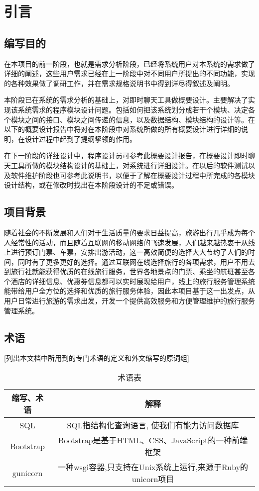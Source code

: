 \chapter{引言}
\section{编写目的}
在本项目的前一阶段，也就是需求分析阶段，已经将系统用户对本系统的需求做了详细的阐述，这些用户需求已经在上一阶段中对不同用户所提出的不同功能，实现的各种效果做了调研工作，并在需求规格说明书中得到详尽得叙述及阐明。

本阶段已在系统的需求分析的基础上，对即时聊天工具做概要设计。主要解决了实现该系统需求的程序模块设计问题。包括如何把该系统划分成若干个模块、决定各个模块之间的接口、模块之间传递的信息，以及数据结构、模块结构的设计等。在以下的概要设计报告中将对在本阶段中对系统所做的所有概要设计进行详细的说明，在设计过程中起到了提纲挈领的作用。

在下一阶段的详细设计中，程序设计员可参考此概要设计报告，在概要设计即时聊天工具所做的模块结构设计的基础上，对系统进行详细设计。在以后的软件测试以及软件维护阶段也可参考此说明书，以便于了解在概要设计过程中所完成的各模块设计结构，或在修改时找出在本阶段设计的不足或错误。


\section{项目背景}
随着社会的不断发展和人们对于生活质量的要求日益提高，旅游出行几乎成为每个人经常性的活动，而且随着互联网的移动网络的飞速发展，人们越来越热衷于从线上进行预订门票、车票，安排出游活动，这一高效简便的选择大大节约了人们的时间，同时有了更多更好的选择。通过互联网在线选择旅行的各项需求，用户不用去到旅行社就能获得优质的在线旅行服务，世界各地景点的门票、乘坐的航班甚至各个酒店的详细信息、优惠券信息都可以实时展现给用户，线上的旅行服务管理系统能带给用户全方位的选择和优质的旅行服务体验，因此本项目基于这一出发点，从用户日常进行旅游的需求出发，开发一个提供高效服务和方便管理维护的旅行服务管理系统。

\section{术语}
[列出本文档中所用到的专门术语的定义和外文缩写的原词组]
\begin{table}[htbp]
\centering
\caption{术语表} \label{tab:terminology}
\begin{tabular}{|c|c|}
    \hline
    缩写、术语 & 解释 \\
    \hline
    SQL & SQL指结构化查询语言, 使我们有能力访问数据库 \\
    Bootstrap & Bootstrap是基于HTML、CSS、JavaScript的一种前端框架 \\
    gunicorn & 一种wsgi容器,只支持在Unix系统上运行,来源于Ruby的unicorn项目 \\
    \hline
\end{tabular}
\end{table}